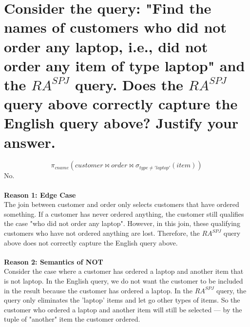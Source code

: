 \documentclass{article}
\begin{document}
\section{Consider the query: "Find the names of customers who did not order any laptop, i.e., did not
order any item of type laptop" and the \(RA^{SPJ} \) query. Does the \(RA^{SPJ} \) query above correctly capture the English query above? Justify your answer.}
\[
\pi_{cname}(customer \bowtie order \bowtie \sigma_{type \neq 'laptop'}(item))
\]
No.\\
\\
\textbf{Reason 1: Edge Case}\\
The join between customer and order only selects customers that have ordered something. If a customer has never ordered anything, the customer still qualifies the case "who did not order any laptop". However, in this join, these qualifying customers who have not ordered anything are lost. Therefore, the \( RA^{SPJ} \) query above does not correctly capture the English query above.\\
\\
\textbf{Reason 2: Semantics of NOT}\\
Consider the case where a customer has ordered a laptop and another item that is not laptop. In the English query, we do not want the customer to be included in the result because the customer has ordered a laptop. In the \(RA^{SPJ}\) query, the query only eliminates the 'laptop' items and let go other types of items. So the customer who ordered a laptop and another item will still be selected --- by the tuple of "another" item the customer ordered.
\end{document}
